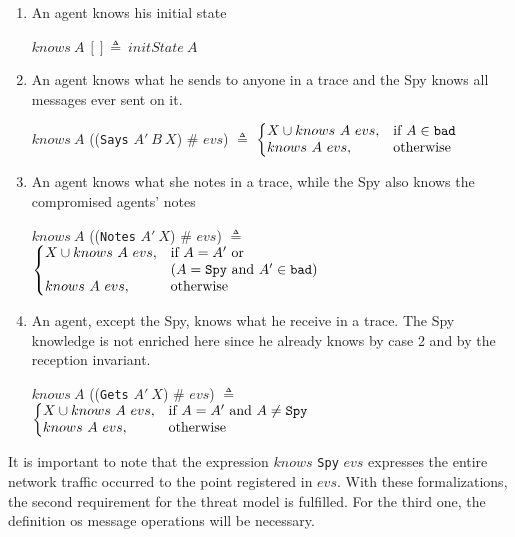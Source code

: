 \begin{enumerate}
  \item An agent knows his initial state
  \begin{center}
    $knows\ A\ [] \triangleq\ initState\ A$
  \end{center}
  \item An agent knows what he sends to anyone in a trace and the Spy knows all messages ever sent on it.
  \begin{center}
    $knows\ A$ ((\texttt{Says} $A'\ B \ X$) \# $evs$) $\triangleq$
    $\left\{
      \begin{array}{@{}ll@{}}
        {X} \cup knows\ A\ evs, & \text{if } A \in \texttt{bad} \\
        knows\ A\ evs, & \text{otherwise}
      \end{array} \right.$
  \end{center}
  \item An agent knows what she notes in a trace, while the Spy also knows the compromised agents' notes
  \begin{center}
    $knows\ A$ ((\texttt{Notes} $A'\ X$) \# $evs$) $\triangleq$
    $\left\{
      \begin{array}{@{}ll@{}}
        {X} \cup knows\ A\ evs, & \text{if } A = A' \text{ or } \\ & (A = \texttt{Spy} \text{ and } A' \in \texttt{bad}) \\
        knows\ A\ evs, & \text{otherwise}
      \end{array} \right.$
  \end{center}
  \item An agent, except the Spy, knows what he receive in a trace. The Spy knowledge is not enriched here since he already knows by case 2 and by the reception invariant.
  \begin{center}
    $knows\ A$ ((\texttt{Gets} $A'\ X$) \# $evs$) $\triangleq$
    $\left\{
      \begin{array}{@{}ll@{}}
        {X} \cup knows\ A\ evs, & \text{if } A = A' \text{ and } A \neq \texttt{Spy} \\
        knows\ A\ evs, & \text{otherwise}
      \end{array} \right.$
  \end{center}
\end{enumerate}

It is important to note that the expression $knows$ \texttt{Spy} $evs$ expresses the entire network traffic occurred to the point registered in $evs$. With these formalizations, the second requirement for the threat model is fulfilled. For the third one, the definition os message operations will be necessary.



